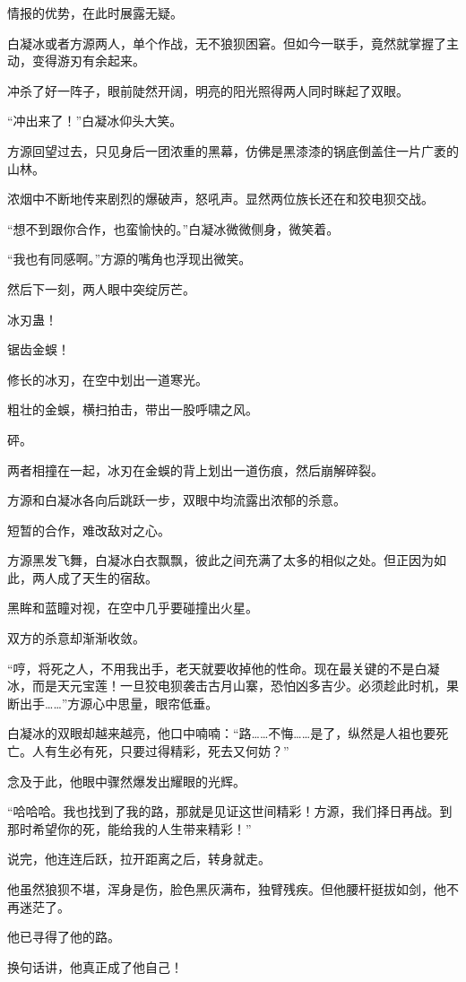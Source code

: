 \begin{this_body}
情报的优势，在此时展露无疑。

白凝冰或者方源两人，单个作战，无不狼狈困窘。但如今一联手，竟然就掌握了主动，变得游刃有余起来。

冲杀了好一阵子，眼前陡然开阔，明亮的阳光照得两人同时眯起了双眼。

“冲出来了！”白凝冰仰头大笑。

方源回望过去，只见身后一团浓重的黑幕，仿佛是黑漆漆的锅底倒盖住一片广袤的山林。

浓烟中不断地传来剧烈的爆破声，怒吼声。显然两位族长还在和狡电狈交战。

“想不到跟你合作，也蛮愉快的。”白凝冰微微侧身，微笑着。

“我也有同感啊。”方源的嘴角也浮现出微笑。

然后下一刻，两人眼中突绽厉芒。

冰刃蛊！

锯齿金蜈！

修长的冰刃，在空中划出一道寒光。

粗壮的金蜈，横扫拍击，带出一股呼啸之风。

砰。

两者相撞在一起，冰刃在金蜈的背上划出一道伤痕，然后崩解碎裂。

方源和白凝冰各向后跳跃一步，双眼中均流露出浓郁的杀意。

短暂的合作，难改敌对之心。

方源黑发飞舞，白凝冰白衣飘飘，彼此之间充满了太多的相似之处。但正因为如此，两人成了天生的宿敌。

黑眸和蓝瞳对视，在空中几乎要碰撞出火星。

双方的杀意却渐渐收敛。

“哼，将死之人，不用我出手，老天就要收掉他的性命。现在最关键的不是白凝冰，而是天元宝莲！一旦狡电狈袭击古月山寨，恐怕凶多吉少。必须趁此时机，果断出手……”方源心中思量，眼帘低垂。

白凝冰的双眼却越来越亮，他口中喃喃：“路……不悔……是了，纵然是人祖也要死亡。人有生必有死，只要过得精彩，死去又何妨？”

念及于此，他眼中骤然爆发出耀眼的光辉。

“哈哈哈。我也找到了我的路，那就是见证这世间精彩！方源，我们择日再战。到那时希望你的死，能给我的人生带来精彩！”

说完，他连连后跃，拉开距离之后，转身就走。

他虽然狼狈不堪，浑身是伤，脸色黑灰满布，独臂残疾。但他腰杆挺拔如剑，他不再迷茫了。

他已寻得了他的路。

换句话讲，他真正成了他自己！

\end{this_body}

